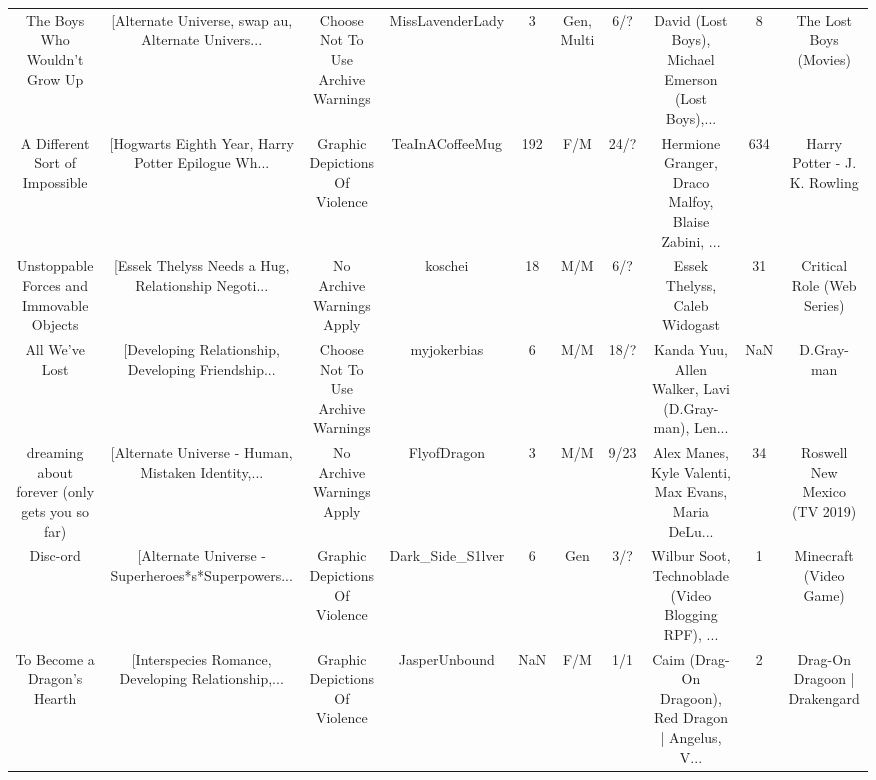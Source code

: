 \begin{table}[h!]
{\begin{tabular}{|c|c|c|c|c|c|c|c|c|c|}
                     The Boys Who Wouldn't Grow Up & [Alternate Universe, swap au, Alternate Univers... &                 Choose Not To Use Archive Warnings &                   MissLavenderLady &         3 &                       Gen, Multi &      6/? & David (Lost Boys), Michael Emerson (Lost Boys),... &        8 &                             The Lost Boys (Movies) \\
                    A Different Sort of Impossible & [Hogwarts Eighth Year, Harry Potter Epilogue Wh... &                     Graphic Depictions Of Violence &                    TeaInACoffeeMug &       192 &                              F/M &     24/? & Hermione Granger, Draco Malfoy, Blaise Zabini, ... &      634 &                       Harry Potter - J. K. Rowling \\
          Unstoppable Forces and Immovable Objects & [Essek Thelyss Needs a Hug, Relationship Negoti... &                          No Archive Warnings Apply &                            koschei &        18 &                              M/M &      6/? &                      Essek Thelyss, Caleb Widogast &       31 &                         Critical Role (Web Series) \\
                                    All We've Lost & [Developing Relationship, Developing Friendship... &                 Choose Not To Use Archive Warnings &                        myjokerbias &         6 &                              M/M &     18/? & Kanda Yuu, Allen Walker, Lavi (D.Gray-man), Len... &      NaN &                                         D.Gray-man \\
     dreaming about forever (only gets you so far) & [Alternate Universe - Human, Mistaken Identity,... &                          No Archive Warnings Apply &                        FlyofDragon &         3 &                              M/M &     9/23 & Alex Manes, Kyle Valenti, Max Evans, Maria DeLu... &       34 &                       Roswell New Mexico (TV 2019) \\
                                          Disc-ord & [Alternate Universe - Superheroes*s*Superpowers... &                     Graphic Depictions Of Violence &                   Dark\_Side\_S1lver &         6 &                              Gen &      3/? & Wilbur Soot, Technoblade (Video Blogging RPF), ... &        1 &                             Minecraft (Video Game) \\
                       To Become a Dragon's Hearth & [Interspecies Romance, Developing Relationship,... &                     Graphic Depictions Of Violence &                      JasperUnbound &       NaN &                              F/M &      1/1 & Caim (Drag-On Dragoon), Red Dragon | Angelus, V... &        2 &                       Drag-On Dragoon | Drakengard \\

\end{tabular}}
\end{table}

